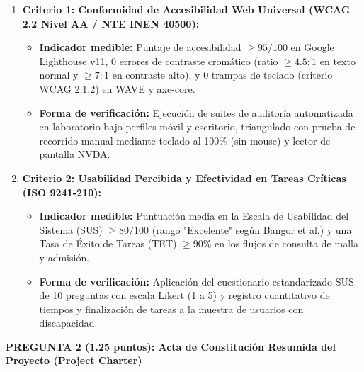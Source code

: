 \documentclass[10pt,a4paper]{article}
\begin{document}
\begin{enumerate}\setlength\itemsep{3pt}\small
    \item \textbf{Criterio 1: Conformidad de Accesibilidad Web Universal (WCAG 2.2 Nivel AA / NTE INEN 40500):}
    \begin{itemize}\footnotesize
        \item \textbf{Indicador medible:} Puntaje de accesibilidad $\ge 95/100$ en Google Lighthouse v11, 0 errores de contraste cromático (ratio $\ge 4.5:1$ en texto normal y $\ge 7:1$ en contraste alto), y 0 trampas de teclado (criterio WCAG 2.1.2) en WAVE y axe-core.
        \item \textbf{Forma de verificación:} Ejecución de suites de auditoría automatizada en laboratorio bajo perfiles móvil y escritorio, triangulado con prueba de recorrido manual mediante teclado al 100\% (sin mouse) y lector de pantalla NVDA.
    \end{itemize}
    \item \textbf{Criterio 2: Usabilidad Percibida y Efectividad en Tareas Críticas (ISO 9241-210):}
    \begin{itemize}\footnotesize
        \item \textbf{Indicador medible:} Puntuación media en la Escala de Usabilidad del Sistema (SUS) $\ge 80/100$ (rango "Excelente" según Bangor et al.) y una Tasa de Éxito de Tareas (TET) $\ge 90\%$ en los flujos de consulta de malla y admisión.
        \item \textbf{Forma de verificación:} Aplicación del cuestionario estandarizado SUS de 10 preguntas con escala Likert (1 a 5) y registro cuantitativo de tiempos y finalización de tareas a la muestra de usuarios con discapacidad.
    \end{itemize}
\end{enumerate}

\vspace{0.2cm}

\begin{tcolorbox}[colback=utiLightBlue, colframe=utiBlue, arc=3pt, left=6pt, right=6pt, top=4pt, bottom=4pt]
\textbf{\color{utiNavy}PREGUNTA 2 (1.25 puntos): Acta de Constitución Resumida del Proyecto (Project Charter)}
\end{tcolorbox}
\end{document}

